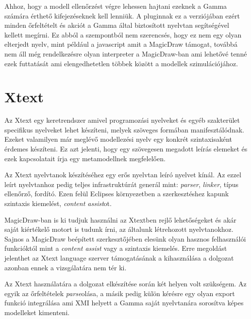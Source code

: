 Ahhoz, hogy a modell ellenőrzést végre lehessen hajtani ezeknek a Gamma számára érthető kifejezéseknek kell lenniük. A pluginnak ez a verziójában ezért minden őrfeltételt és akciót a Gamma által biztosított nyelvtan segítségével kellett megírni. Ez abból a szempontból nem szerencsés, hogy ez nem egy olyan elterjedt nyelv, mint például a javascript amit a MagicDraw támogat, továbbá nem áll még rendelkezésre olyan interpreter a MagicDraw-ban ami lehetővé tenné ezek futtatását ami elengedhetetlen többek között a modellek szimulációjához.


\section{Xtext}

Az Xtext egy keretrendszer amivel programozási nyelveket és egyéb szakterület specifikus nyelveket lehet készíteni, melyek szöveges formában manifesztálódnak. Ezeket valamilyen már meglévő modellezési nyelv egy konkrét szintaxisaként érdemes készíteni. Ez azt jelenti, hogy egy szövegesen megadott leírás elemeket és ezek kapcsolatait írja egy metamodellnek megfelelően.

Az Xtext nyelvtanok készítéséhez egy erős nyelvtan leíró nyelvet kínál. Az ezzel leírt nyelvtanhoz pedig teljes infrastruktúrát generál mint: \emph{parser}, \emph{linker}, típus ellenőrző, fordító. Ezen felül Eclipses környezetben a szerkesztéshez kapunk szintaxis kiemelést, \emph{content assist}ot.

MagicDraw-ban is ki tudjuk használni az Xtextben rejlő lehetőségeket és akár saját kiértékelő motort is tudunk írni, az általunk létrehozott nyelvtanokhoz. Sajnos a MagicDraw beépített szerkesztőjében elesünk olyan hasznos felhasználói funkcióktól mint a \emph{content assist} vagy a szintaxis kiemelés. Erre megoldást jelenthet az Xtext language szerver támogatásának a kihasználása a dolgozat azonban ennek a vizsgálatára nem tér ki.

Az Xtext használatára a dolgozat elkészítése során két helyen volt szükségem. Az egyik az őrfeltételek \emph{parse}olása, a másik pedig külön kérésre egy olyan export funkció integrálása ami XMI helyett a Gamma saját nyelvtanára sorosítva képes modelleket kimenteni.



